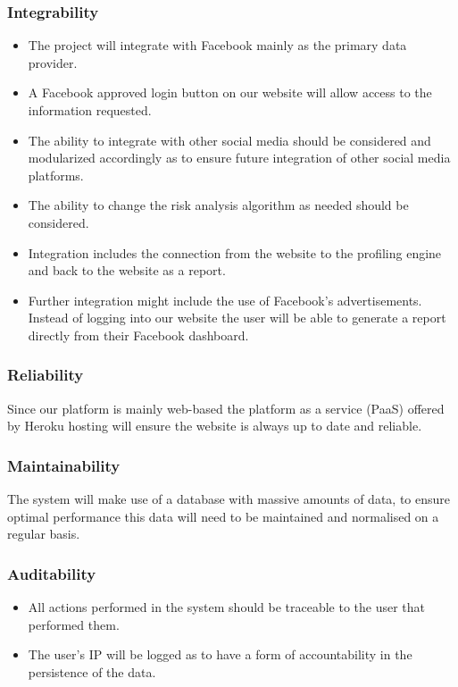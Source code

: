 \documentclass{article}
\begin{document}
		\subsubsection{Integrability}
		\begin{itemize}
			\item The project will integrate with Facebook mainly as the primary data provider.
			\item A Facebook approved login button on our website will allow access to the information requested. 
			\item The ability to integrate with other social media should be considered and modularized accordingly as to ensure future integration of other social media platforms. 
		\item The ability to change the risk analysis algorithm as needed should be considered.
		\item Integration includes the connection from the website to the profiling engine and back to the website as a report.
		\item Further integration might include the use of Facebook's advertisements. Instead of logging into our website the user will be able to generate a report directly from their Facebook dashboard.
		\end{itemize}		
		\subsubsection{Reliability}
		Since our platform is mainly web-based the platform as a service (PaaS) offered by Heroku hosting will ensure the website is always up to date and reliable.
		\subsubsection{Maintainability}
		The system will make use of a database with massive amounts of data, to ensure optimal performance this data will need to be maintained and normalised on a regular basis.
		\subsubsection{Auditability}
		\begin{itemize}
			\item All actions performed in the system should be traceable to the user that performed them.
			\item The user's IP  will be logged as to have a form of accountability in the persistence of the data.
		\end{itemize}
\end{document}
